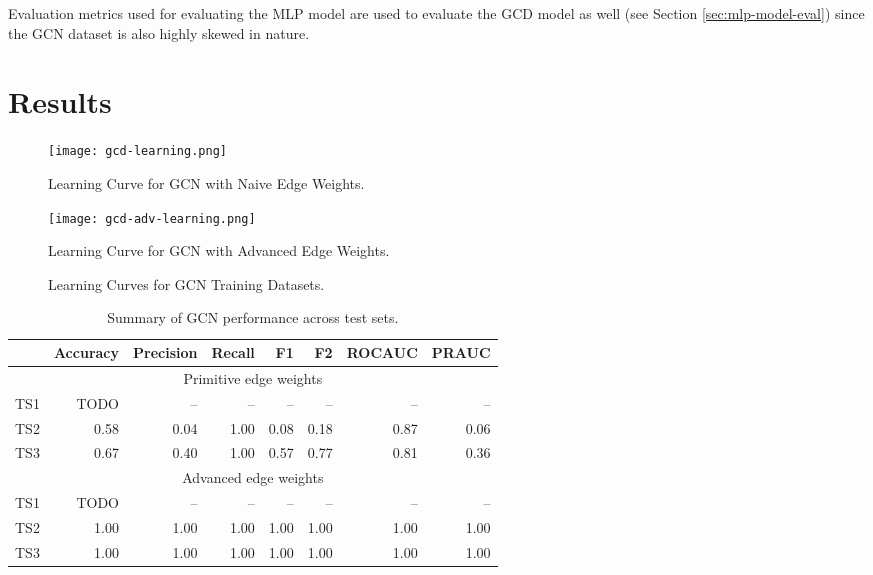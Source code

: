 Evaluation metrics used for evaluating the MLP model are used to
evaluate the GCD model as well (see Section \ref{sec:mlp-model-eval})
since the GCN dataset is also highly skewed in nature.

\section{Results}
\label{sec:gcd-disc}

\begin{figure}[htb]
  \centering
  \begin{minipage}{0.49\textwidth}
    \centering
    \texttt{[image: gcd-learning.png]}
    \caption{Learning Curve for GCN with Naive Edge Weights.}
  \end{minipage}
  \begin{minipage}{0.49\textwidth}
    \centering
    \texttt{[image: gcd-adv-learning.png]}
    \caption{Learning Curve for GCN with Advanced Edge Weights.}
  \end{minipage}
  \caption{Learning Curves for GCN Training Datasets.}
  \label{fig:gcn-learning}
\end{figure}

\begin{table}[htb]
  \begin{tabular}{lrrrrrrr}
    \hline
    & Accuracy & Precision & Recall & F1 & F2 & ROCAUC & PRAUC \\
    \hline
    \multicolumn{8}{c}{Primitive edge weights} \\
    \hline
    TS1 & TODO & -- & -- & -- & -- & -- & -- \\
    TS2 & 0.58 & 0.04 & 1.00 & 0.08 & 0.18 & 0.87 & 0.06 \\
    TS3 & 0.67 & 0.40 & 1.00 & 0.57 & 0.77 & 0.81 & 0.36 \\
    \hline
    \multicolumn{8}{c}{Advanced edge weights} \\
    \hline
    TS1 & TODO & -- & -- & -- & -- & -- & -- \\
    TS2 & 1.00 & 1.00 & 1.00 & 1.00 & 1.00 & 1.00 & 1.00 \\
    TS3 & 1.00 & 1.00 & 1.00 & 1.00 & 1.00 & 1.00 & 1.00 \\    
  \end{tabular}
  \caption{Summary of GCN performance across test sets.}
  \label{tab:gcn-results}
\end{table}

